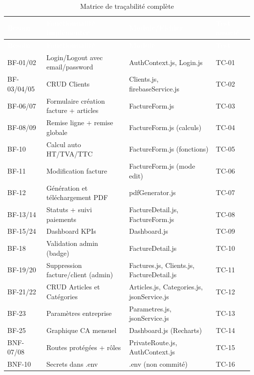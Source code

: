 \documentclass[12pt,a4paper]{report}
\begin{document}
\begin{landscape}
\begin{longtable}{|l|X|l|l|}
\caption{Matrice de traçabilité complète} \label{tab:tracabilite} \\
\hline
\rowcolor{emsiblue}\textcolor{white}{\textbf{Besoin}} & \textcolor{white}{\textbf{Fonctionnalité implémentée}} & \textcolor{white}{\textbf{Module/Fichier}} & \textcolor{white}{\textbf{Test associé}} \\
\hline
\endfirsthead
\hline
\rowcolor{emsiblue}\textcolor{white}{\textbf{Besoin}} & \textcolor{white}{\textbf{Fonctionnalité}} & \textcolor{white}{\textbf{Module}} & \textcolor{white}{\textbf{Test}} \\
\hline
\endhead
BF-01/02 & Login/Logout avec email/password & AuthContext.js, Login.js & TC-01 \\
BF-03/04/05 & CRUD Clients & Clients.js, firebaseService.js & TC-02 \\
BF-06/07 & Formulaire création facture + articles & FactureForm.js & TC-03 \\
BF-08/09 & Remise ligne + remise globale & FactureForm.js (calculs) & TC-04 \\
BF-10 & Calcul auto HT/TVA/TTC & FactureForm.js (fonctions) & TC-05 \\
BF-11 & Modification facture & FactureForm.js (mode edit) & TC-06 \\
BF-12 & Génération et téléchargement PDF & pdfGenerator.js & TC-07 \\
BF-13/14 & Statuts + suivi paiements & FactureDetail.js, FactureForm.js & TC-08 \\
BF-15/24 & Dashboard KPIs & Dashboard.js & TC-09 \\
BF-18 & Validation admin (badge) & FactureDetail.js & TC-10 \\
BF-19/20 & Suppression facture/client (admin) & Factures.js, Clients.js, FactureDetail.js & TC-11 \\
BF-21/22 & CRUD Articles et Catégories & Articles.js, Categories.js, jsonService.js & TC-12 \\
BF-23 & Paramètres entreprise & Parametres.js, jsonService.js & TC-13 \\
BF-25 & Graphique CA mensuel & Dashboard.js (Recharts) & TC-14 \\
BNF-07/08 & Routes protégées + rôles & PrivateRoute.js, AuthContext.js & TC-15 \\
BNF-10 & Secrets dans .env & .env (non commité) & TC-16 \\
\hline
\end{longtable}
\end{landscape}
\end{document}
